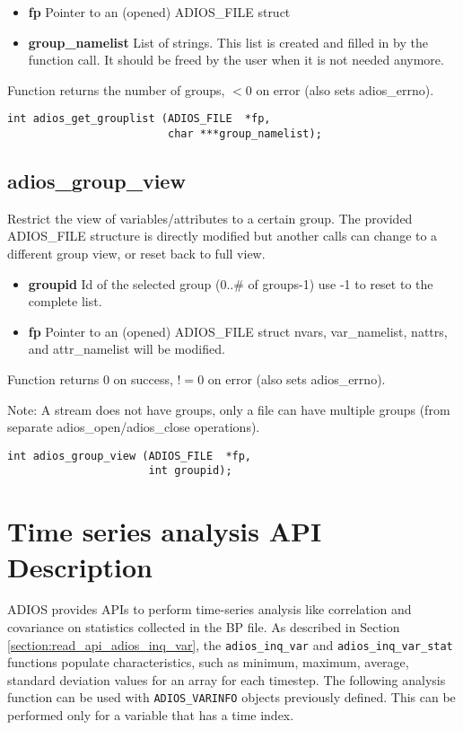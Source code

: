 \begin{itemize}
\item{\bf fp} Pointer to an (opened) ADIOS\_FILE struct
\item{\bf group\_namelist} List of strings. This list is created and filled in by the function call. It should be freed by the user when it is not needed anymore.
\end{itemize}

Function returns the number of groups, $<0$ on error (also sets adios\_errno).

\begin{lstlisting}[alsolanguage=C]
int adios_get_grouplist (ADIOS_FILE  *fp, 
                         char ***group_namelist);
\end{lstlisting}


\subsection{adios\_group\_view}
Restrict the view of variables/attributes to a certain group.
The provided ADIOS\_FILE structure is directly modified but
another calls can change to a different group view, or reset
back to full view.

\begin{itemize}
\item{\bf groupid} Id of the selected group (0..\# of groups-1) use -1 to reset to the complete list.
\item{\bf fp} Pointer to an (opened) ADIOS\_FILE struct nvars, var\_namelist, nattrs, and attr\_namelist will be modified.
\end{itemize}

Function returns 0 on success, $!=0$ on error (also sets adios\_errno).

Note: A stream does not have groups, only a file can have multiple groups 
(from separate adios\_open/adios\_close operations). 

\begin{lstlisting}[alsolanguage=C]
int adios_group_view (ADIOS_FILE  *fp, 
                      int groupid);
\end{lstlisting}


\section{Time series analysis API Description}

ADIOS provides APIs to perform time-series analysis like correlation and covariance 
on statistics collected in the BP file. As described in 
Section \ref{section:read_api_adios_inq_var}, the \verb+adios_inq_var+ and 
\verb+adios_inq_var_stat+ functions
populate characteristics, such as minimum, maximum, average, standard deviation 
values for an array for each timestep. The following analysis function can be used 
with \verb+ADIOS_VARINFO+ objects previously defined. This can be performed only for 
a variable that has a time index.

